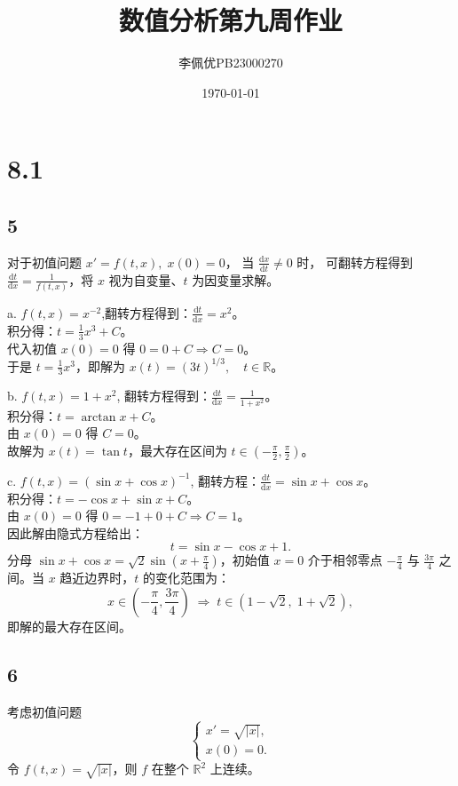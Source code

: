 \documentclass{article}
\title{数值分析第九周作业}
\date{\today}
\author{李佩优PB23000270}
\begin{document}
\maketitle

\section*{8.1}
\subsection*{5}
对于初值问题 \(x' = f(t,x),\; x(0)=0\)，
当 \(\frac{\mathrm{d}x}{\mathrm{d}t} \neq 0\) 时，
可翻转方程得到 \(\frac{\mathrm{d}t}{\mathrm{d}x} = \frac{1}{f(t,x)}\)，将 \(x\) 视为自变量、\(t\) 为因变量求解。

a. \(f(t,x) = x^{-2}\),翻转方程得到：\(\frac{\mathrm{d}t}{\mathrm{d}x} = x^{2}\)。  \\
积分得：\(t = \frac{1}{3}x^{3} + C\)。  \\
代入初值 \(x(0)=0\) 得 \(0 = 0 + C \Rightarrow C = 0\)。  \\
于是 \(t = \frac{1}{3}x^{3}\)，即解为 \(x(t) = (3t)^{1/3},\quad t \in \mathbb{R}\)。  

b. \(f(t,x) = 1+x^{2}\),
翻转方程得到：\(\frac{\mathrm{d}t}{\mathrm{d}x} = \frac{1}{1+x^{2}}\)。  \\
积分得：\(t = \arctan x + C\)。  \\
由 \(x(0)=0\) 得 \(C=0\)。  \\
故解为 \(x(t) = \tan t\)，最大存在区间为 \(t \in \left(-\frac{\pi}{2}, \frac{\pi}{2}\right)\)。

c. \(f(t,x) = (\sin x + \cos x)^{-1}\),
翻转方程：\(\frac{\mathrm{d}t}{\mathrm{d}x} = \sin x + \cos x\)。  \\
积分得：\(t = -\cos x + \sin x + C\)。  \\
由 \(x(0)=0\) 得 \(0 = -1 + 0 + C \Rightarrow C = 1\)。 \\ 
因此解由隐式方程给出：
\[
t = \sin x - \cos x + 1.
\]
分母 \(\sin x + \cos x = \sqrt{2}\sin\left(x+\frac{\pi}{4}\right)\)，初始值 \(x=0\) 介于相邻零点 \(-\frac{\pi}{4}\) 与 \(\frac{3\pi}{4}\) 之间。当 \(x\) 趋近边界时，\(t\) 的变化范围为：
\[
x \in \left(-\frac{\pi}{4}, \frac{3\pi}{4}\right) \;\Longrightarrow\; t \in \left(1-\sqrt{2},\; 1+\sqrt{2}\right),
\]
即解的最大存在区间。

\subsection*{6}
考虑初值问题
\[
\begin{cases}
x' = \sqrt{|x|}, \\
x(0) = 0.
\end{cases}
\]
令 \(f(t,x) = \sqrt{|x|}\)，则 \(f\) 在整个 \(\mathbb{R}^2\) 上连续。
\end{document}

